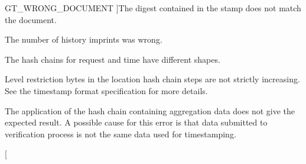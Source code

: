 \begin{Desc}
\begin{description}
{\hypertarget{group__common_gga43b0c0f44bcf02caf0c2866b1f647a35a9f505c283a024218f3453e3a3ecaaf50}{
GT\_\-WRONG\_\-DOCUMENT}
\label{group__common_gga43b0c0f44bcf02caf0c2866b1f647a35a9f505c283a024218f3453e3a3ecaaf50}
}]The digest contained in the stamp does not match the document. \item[{\em 
\hypertarget{group__common_gga43b0c0f44bcf02caf0c2866b1f647a35a14ca98db27d15382884963cdc73ceb7c}{
GT\_\-WRONG\_\-SIZE\_\-OF\_\-HISTORY}
\label{group__common_gga43b0c0f44bcf02caf0c2866b1f647a35a14ca98db27d15382884963cdc73ceb7c}
}]The number of history imprints was wrong. \item[{\em 
\hypertarget{group__common_gga43b0c0f44bcf02caf0c2866b1f647a35a4aaf89798478916e6fd0c52d91b925b9}{
GT\_\-REQUEST\_\-TIME\_\-MISMATCH}
\label{group__common_gga43b0c0f44bcf02caf0c2866b1f647a35a4aaf89798478916e6fd0c52d91b925b9}
}]The hash chains for request and time have different shapes. \item[{\em 
\hypertarget{group__common_gga43b0c0f44bcf02caf0c2866b1f647a35a24646a453a06ef1ed86d0759b67e1d3b}{
GT\_\-INVALID\_\-LENGTH\_\-BYTES}
\label{group__common_gga43b0c0f44bcf02caf0c2866b1f647a35a24646a453a06ef1ed86d0759b67e1d3b}
}]Level restriction bytes in the location hash chain steps are not strictly increasing. See the timestamp format specification for more details. \item[{\em 
\hypertarget{group__common_gga43b0c0f44bcf02caf0c2866b1f647a35a90efaf44bf00c048dd3538275a51336b}{
GT\_\-INVALID\_\-AGGREGATION}
\label{group__common_gga43b0c0f44bcf02caf0c2866b1f647a35a90efaf44bf00c048dd3538275a51336b}
}]The application of the hash chain containing aggregation data does not give the expected result. A possible cause for this error is that data submitted to verification process is not the same data used for timestamping. \item[{\em 
}
\end{description}
\end{Desc}
